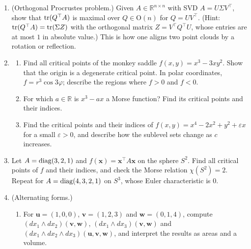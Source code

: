 \begin{enumerate}[leftmargin=*]
\begin{enumerate}[label=(\alph*)]
        \item For $K_1 = \begin{pmatrix} 0 & 0 & 0 \\ 0 & 0 & -1 \\ 0 & 1 & 0 \end{pmatrix}$, compute $K_1^2$ and $K_1^3$, and show that $e^{tK_1}$ is the rotation by the angle $t$ about the $x_1$-axis.
        \item With $K_2$ and $K_3$ the analogous generators of the rotations about the $x_2$- and $x_3$-axes, check that $[K_1, K_2] = K_3$. What does this say about rotations about different axes?
    \end{enumerate}
    \item\label{A-exer:procrustes} (Orthogonal Procrustes problem.) Given $A \in \mathbb{R}^{n \times n}$ with SVD $A = U\Sigma V^\top$, show that $\operatorname{tr}(Q^\top A)$ is maximal over $Q \in \mathrm{O}(n)$ for $Q = UV^\top$. (Hint: $\operatorname{tr}(Q^\top A) = \operatorname{tr}(\Sigma Z)$ with the orthogonal matrix $Z = V^\top Q^\top U$, whose entries are at most $1$ in absolute value.) This is how one aligns two point clouds by a rotation or reflection.
    \item \begin{enumerate}[label=(\alph*)]
        \item Find all critical points of the monkey saddle $f(x, y) = x^3 - 3xy^2$. Show that the origin is a degenerate critical point. In polar coordinates, $f = r^3\cos 3\varphi$; describe the regions where $f > 0$ and $f < 0$.
        \item For which $a \in \mathbb{R}$ is $x^3 - ax$ a Morse function? Find its critical points and their indices.
        \item Find the critical points and their indices of $f(x, y) = x^4 - 2x^2 + y^2 + \varepsilon x$ for a small $\varepsilon > 0$, and describe how the sublevel sets change as $c$ increases.
    \end{enumerate}
    \item Let $A = \operatorname{diag}(3, 2, 1)$ and $f(\mathbf{x}) = \mathbf{x}^\top A\mathbf{x}$ on the sphere $S^2$. Find all critical points of $f$ and their indices, and check the Morse relation $\chi(S^2) = 2$. Repeat for $A = \operatorname{diag}(4, 3, 2, 1)$ on $S^3$, whose Euler characteristic is $0$.
    \item\label{A-exer:wedge} (Alternating forms.)
    \begin{enumerate}[label=(\alph*)]
        \item For $\mathbf{u} = (1, 0, 0)$, $\mathbf{v} = (1, 2, 3)$ and $\mathbf{w} = (0, 1, 4)$, compute $(dx_1 \wedge dx_2)(\mathbf{v}, \mathbf{w})$, $(dx_1 \wedge dx_3)(\mathbf{v}, \mathbf{w})$ and $(dx_1 \wedge dx_2 \wedge dx_3)(\mathbf{u}, \mathbf{v}, \mathbf{w})$, and interpret the results as areas and a volume.

\end{enumerate}
\end{enumerate}
